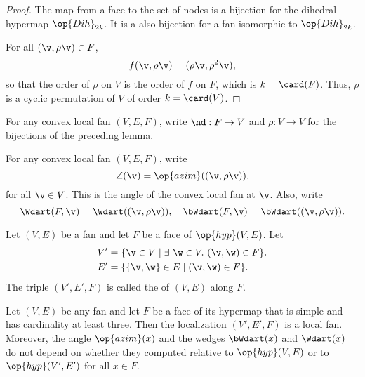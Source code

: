 \begin{proof} The map from a face to the set of nodes is a bijection
  for the dihedral hypermap $\op{Dih}_{2k}$. It is a also bijection
  for a fan isomorphic to $\op{Dih}_{2k}$.

For all $(\v,\rho \v)\in F$,
\[ 
f(\v,\rho \v) = (\rho\v,\rho^2\v),
\] 
so that the order of $\rho$ on $V$ is the order of $f$ on $F$, which
is $k=\card(F)$.  Thus, $\rho$ is a cyclic permutation of $V$ of order
$k=\card(V)$.
\end{proof}

\begin{definition}[$\rho$,~$\nd$] 
For any convex local fan $(V,E,F)$, write
$\nd:F\to V$ and $\rho:V\to V$ for the bijections of the preceding
lemma.
\end{definition}
%
%

\begin{definition}
For any convex local fan $(V,E,F)$,
write
\[ 
\angle(\v) = \op{azim}((\v,\rho\v)),
\] 
for all $\v\in V$.  This is the  angle of the convex
local fan at $\v$.  Also, write
\[ 
  \Wdart(F,\v) = \Wdart((\v,\rho \v)),\quad 
\bWdart(F,\v) =\bWdart((\v,\rho \v)).
\] 
%
%
%
\end{definition}


\begin{definition}[localization]
 Let $(V,E)$ be a fan and let $F$ be
a face of $\op{hyp}(V,E)$.  Let
\begin{align*}
V' &= \{\v\in V \mid \exists~\w\in V.~(\v,\w)\in F\}.\\
E' &= \{\{\v,\w\} \in E\mid (\v,\w)\in F\}.
\end{align*}
The triple $(V',E',F)$ is called the  of $(V,E)$ along $F$.
\end{definition}
%


\begin{lemma}[localization]
\label{lemma:localization}
Let $(V,E)$ be any fan and let $F$ be a face of its hypermap that is
simple and has cardinality at least three.  Then the localization
$(V',E',F)$ is a local fan.  Moreover, the angle $\op{azim}(x)$ and
the wedges $\bWdart(x)$ and $\Wdart(x)$ do not depend on whether they
computed relative to $\op{hyp}(V,E)$ or to $\op{hyp}(V',E')$ for all
$x\in F$.
\end{lemma}



